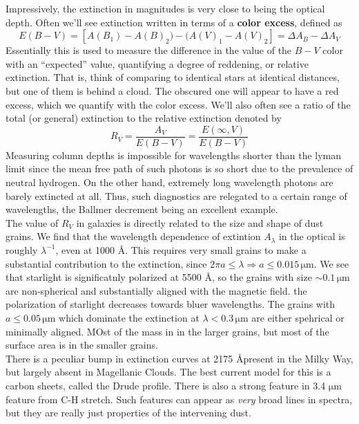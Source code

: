 \documentclass[10pt]{article}
\numberwithin{equation}{section}
\newcommand{\n}{\noindent}
\begin{document}
Impressively, the extinction in magnitudes is very close to being the optical
depth. Often we'll see extinction written in terms of a \textbf{color excess}, 
defined as
\begin{equation}
  \label{eq:dust:8} E(B-V) = \left[A(B_1) - A(B)_2) - (A(V)_1 - A(V)_2\right] = 
  \Delta A_B - \Delta A_V
\end{equation}
Essentially this is used to measure the difference in the value of the $B-V$
color with an ``expected'' value, quantifying a degree of reddening, or
relative extinction. That is, think of comparing to identical stars at
identical distances, but one of them is behind a cloud. The obscured one will
appear to have a red excess, which we quantify with the color excess. We'll
also often see a ratio of the total (or general) extinction to the relative
extinction denoted by
\begin{equation}
  \label{eq:dust:9} R_V = \frac{A_V}{E(B-V)} = \frac{E(\infty, V)}{E(B-V)}
\end{equation}
Measuring column depths is impossible for wavelengths shorter than the lyman
limit since the mean free path of such photons is so short due to the
prevalence of neutral hydrogen. On the other hand, extremely long wavelength
photons are barely extincted at all. Thus, such diagnostics are relegated to a
certain range of wavelengths, the Ballmer decrement being an excellent
example.\\

\n The value of $R_V$ in galaxies is directly related to the size and shape of
dust grains. We find that the wavelength dependence of extintion $A_\lambda$ in
the optical is roughly $\lambda^{-1}$, even at 1000 \AA. This requires very
small grains to make a substantial contribution to the extinction, since $2\pi
a \leq \lambda \Rightarrow a \leq 0.015\,\mathrm{\mu m}$. We see that starlight
is significatnly polarized at 5500 \AA, so the grains with size $\sim
0.1\,\mathrm{\mu m}$ are non-spherical and substantially aligned with the
magnetic field. the polarization of starlight decreases towards bluer
wavelengths. The grains with $a\leq 0.05\,\mathrm{\mu m}$ which dominate the
extinction at $\lambda < 0.3\,\mathrm{\mu m}$ are either spehrical or minimally
aligned. MOst of the mass in in the larger grains, but most of the surface area
is in the smaller grains.\\

\n There is a peculiar bump in extinction curves at 2175 \AA present in the
Milky Way, but largely absent in Magellanic Clouds. The best current model for
this is a carbon sheets, called the Drude profile. There is also a strong
feature in 3.4 $\mathrm{\mu m}$ feature from C-H stretch. Such features can
appear as \emph{very} broad lines in spectra, but they are really just
properties of the intervening dust.
\end{document}
